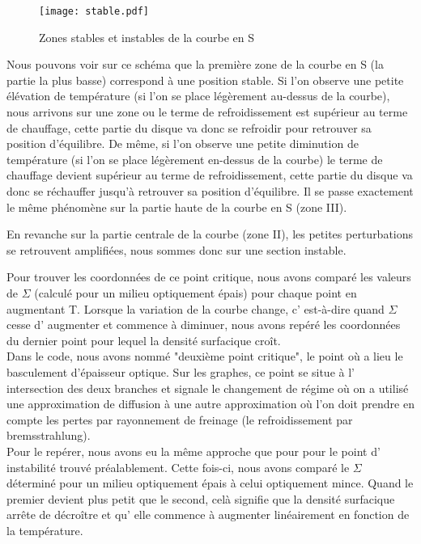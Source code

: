 \begin{figure}[htb!]
	\centering
	\texttt{[image: stable.pdf]}
	\caption{Zones stables et instables de la courbe en S}
	\label{Fig::stable}
\end{figure}

Nous pouvons voir sur ce schéma que la première zone de la courbe en S (la partie la plus basse) correspond à une position stable. Si l'on observe une petite élévation de température (si l'on se place légèrement au-dessus de la courbe), nous arrivons sur une zone ou le terme de refroidissement est supérieur au terme de chauffage, cette partie du disque va donc se refroidir pour retrouver sa position d'équilibre. De même, si l'on observe une petite diminution de température (si l'on se place légèrement en-dessus de la courbe) le terme de chauffage devient supérieur au terme de refroidissement, cette partie du disque va donc se réchauffer jusqu'à retrouver sa position d'équilibre. Il se passe exactement le même phénomène sur la partie haute de la courbe en S (zone III).

En revanche sur la partie centrale de la courbe (zone II), les petites perturbations se retrouvent amplifiées, nous sommes donc sur une section instable.


Pour trouver les coordonnées de ce point critique, nous avons comparé les valeurs de $\Sigma$ (calculé pour un milieu optiquement épais) pour chaque point en augmentant T. Lorsque la variation de la courbe change, c' est-à-dire quand $\Sigma$ cesse d' augmenter et commence à diminuer, nous avons repéré les coordonnées du dernier point pour lequel la densité surfacique croît.  
\\
Dans le code, nous avons nommé "deuxième point critique", le point où a lieu le basculement d'épaisseur optique. Sur les graphes, ce point se situe à l' intersection des deux branches et signale le changement de régime où on a utilisé une approximation de diffusion à une autre approximation où l'on doit prendre en compte les pertes par rayonnement de freinage (le refroidissement par bremsstrahlung).
\\
Pour le repérer, nous avons eu la même approche que pour pour le point d' instabilité trouvé préalablement. Cette fois-ci, nous avons comparé le $\Sigma$ déterminé pour un milieu optiquement épais à celui optiquement mince. Quand le premier devient plus petit que le second, celà signifie que la densité surfacique arrête de décroître et qu' elle commence à augmenter linéairement en fonction de la température. 
\\

